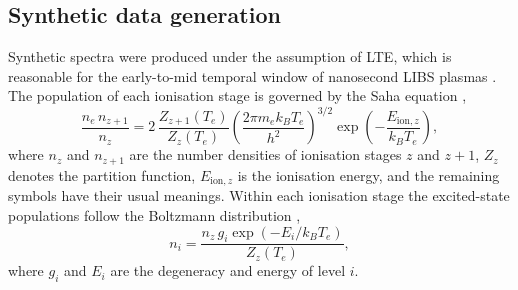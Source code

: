 \documentclass{iopjournal}
\begin{document}


\subsection{Synthetic data generation} \label{sec:synth}

Synthetic spectra were produced under the assumption of LTE, which is reasonable for the early-to-mid temporal window of nanosecond LIBS plasmas \cite{cristoforetti_local_2010}.
The population of each ionisation stage is governed by the Saha equation \cite{fujimoto_plasma_2004},
\begin{equation} \label{eq:saha}
\frac{n_e \, n_{z+1}}{n_z} = 2\,\frac{Z_{z+1}(T_e)}{Z_z(T_e)} \left(\frac{2\pi m_e k_B T_e}{h^2}\right)^{3/2} \exp\!\left(-\frac{E_{\mathrm{ion},z}}{k_B T_e}\right),
\end{equation}
where $n_z$ and $n_{z+1}$ are the number densities of ionisation stages $z$ and $z+1$, $Z_z$ denotes the partition function, $E_{\mathrm{ion},z}$ is the ionisation energy, and the remaining symbols have their usual meanings.
Within each ionisation stage the excited-state populations follow the Boltzmann distribution \cite{fujimoto_plasma_2004},
\begin{equation} \label{eq:boltz}
n_i = \frac{n_z \, g_i \exp(-E_i / k_B T_e)}{Z_z(T_e)},
\end{equation}
where $g_i$ and $E_i$ are the degeneracy and energy of level $i$.
\end{document}
